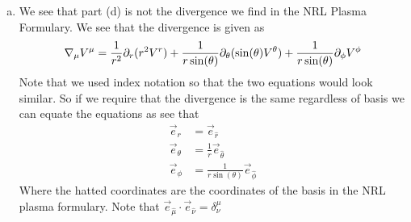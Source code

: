 \documentclass[11pt]{article}
\numberwithin{equation}{section}
\begin{document}
\begin{enumerate}[(a)]
\item
We see that part (d) is not the divergence we find in the NRL Plasma Formulary. We see that the divergence is given as 
$$\bold\nabla_{\mu}V^{\mu} = \frac{1}{r^2}\partial_{r}(r^2V^{r}) + \frac{1}{r\sin(\theta)}\partial_{\theta}(\sin(\theta)V^{\theta}) + \frac{1}{r\sin(\theta)}\partial_{\phi}V^{\phi}$$
Note that we used index notation so that the two equations would look similar. So if we require that the divergence is the same regardless of basis we can equate the equations as see that 
\begin{align*}
\vec{e}_{r} &= \vec{e}_{\hat{r}}\\
\vec{e}_{\theta} &= \frac{1}{r}\vec{e}_{\hat{\theta}}\\
\vec{e}_{\phi} &= \frac{1}{r\sin(\theta)}\vec{e}_{\hat{\phi}}
\end{align*}
Where the hatted coordinates are the coordinates of the basis in the NRL plasma formulary. Note that $\vec{e}_{\hat{\mu}}\cdot\vec{e}_{\hat{\nu}} = \delta^{\mu}_{\nu}$
\end{enumerate}
\end{document}
